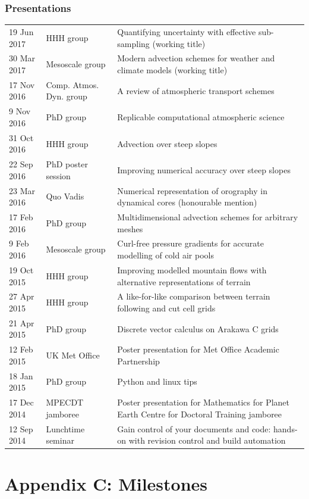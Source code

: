\documentclass[a4paper,11pt]{article}
\begin{document}
\subsubsection*{Presentations}
\begin{tabularx}{\linewidth}{l l X}
19 Jun 2017 & HHH group & Quantifying uncertainty with effective sub-sampling (working title) \\
30 Mar 2017 & Mesoscale group & Modern advection schemes for weather and climate models (working title) \\
17 Nov 2016 & Comp. Atmos. Dyn. group & A review of atmospheric transport schemes \\
9 Nov 2016 & PhD group & Replicable computational atmospheric science \\
31 Oct 2016 & HHH group & Advection over steep slopes \\
22 Sep 2016 & PhD poster session & Improving numerical accuracy over steep slopes \\
23 Mar 2016 & Quo Vadis & Numerical representation of orography in dynamical cores (honourable mention) \\
17 Feb 2016 & PhD group & Multidimensional advection schemes for arbitrary meshes \\
9 Feb 2016 & Mesoscale group & Curl-free pressure gradients for accurate modelling of cold air pools \\
19 Oct 2015 & HHH group & Improving modelled mountain flows with alternative representations of terrain \\
27 Apr 2015 & HHH group & A like-for-like comparison between terrain following and cut cell grids \\
21 Apr 2015 & PhD group & Discrete vector calculus on Arakawa C grids \\
12 Feb 2015 & UK Met Office & Poster presentation for Met Office Academic Partnership \\
18 Jan 2015 & PhD group & Python and linux tips \\
17 Dec 2014 & MPECDT jamboree & Poster presentation for Mathematics for Planet Earth Centre for Doctoral Training jamboree \\
12 Sep 2014 & Lunchtime seminar  & Gain control of your documents and code: hands-on with revision control and build automation \\
\end{tabularx}

\section*{Appendix C: Milestones}
\end{document}
